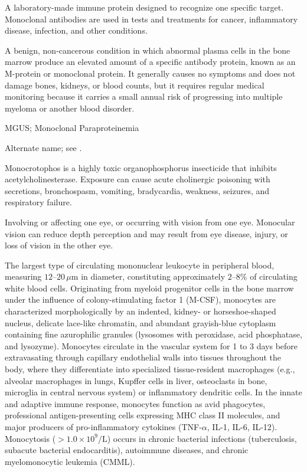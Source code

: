  A laboratory-made immune protein designed to recognize one specific target. Monoclonal antibodies are used in tests and treatments for cancer, inflammatory disease, infection, and other conditions.

 A benign, non-cancerous condition in which abnormal plasma cells in the bone marrow produce an elevated amount of a specific antibody protein, known as an M-protein or monoclonal protein. It generally causes no symptoms and does not damage bones, kidneys, or blood counts, but it requires regular medical monitoring because it carries a small annual risk of progressing into multiple myeloma or another blood disorder.

\synonyms
MGUS; Monoclonal Paraproteinemia

 Alternate name; see .

 Monocrotophos is a highly toxic organophosphorus insecticide that inhibits acetylcholinesterase. Exposure can cause acute cholinergic poisoning with secretions, bronchospasm, vomiting, bradycardia, weakness, seizures, and respiratory failure.

 Involving or affecting one eye, or occurring with vision from one eye. Monocular vision can reduce depth perception and may result from eye disease, injury, or loss of vision in the other eye.

 The largest type of circulating mononuclear leukocyte in peripheral blood, measuring $12\text{--}20\,\mu\text{m}$ in diameter, constituting approximately $2\text{--}8\%$ of circulating white blood cells. Originating from myeloid progenitor cells in the bone marrow under the influence of colony-stimulating factor 1 (M-CSF), monocytes are characterized morphologically by an indented, kidney- or horseshoe-shaped nucleus, delicate lace-like chromatin, and abundant grayish-blue cytoplasm containing fine azurophilic granules (lysosomes with peroxidase, acid phosphatase, and lysozyme). Monocytes circulate in the vascular system for 1 to 3 days before extravasating through capillary endothelial walls into tissues throughout the body, where they differentiate into specialized tissue-resident macrophages (e.g., alveolar macrophages in lungs, Kupffer cells in liver, osteoclasts in bone, microglia in central nervous system) or inflammatory dendritic cells. In the innate and adaptive immune response, monocytes function as avid phagocytes, professional antigen-presenting cells expressing MHC class II molecules, and major producers of pro-inflammatory cytokines (TNF-$\alpha$, IL-1, IL-6, IL-12). Monocytosis ($>1.0\times 10^9/\text{L}$) occurs in chronic bacterial infections (tuberculosis, subacute bacterial endocarditis), autoimmune diseases, and chronic myelomonocytic leukemia (CMML).


